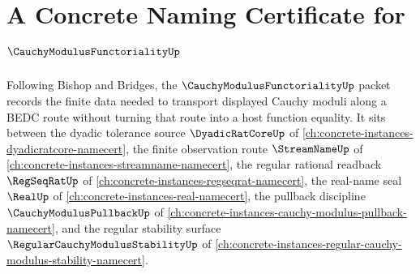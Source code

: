 \chapter{A Concrete Naming Certificate for $\CauchyModulusFunctorialityUp$}
\label{ch:concrete-instances-cauchy-modulus-functoriality-namecert}

Following Bishop and Bridges, the $\CauchyModulusFunctorialityUp$ packet records the finite data needed to transport displayed Cauchy moduli along a BEDC route without turning that route into a host function equality. It sits between the dyadic tolerance source $\DyadicRatCoreUp$ of \autoref{ch:concrete-instances-dyadicratcore-namecert}, the finite observation route $\StreamNameUp$ of \autoref{ch:concrete-instances-streamname-namecert}, the regular rational readback $\RegSeqRatUp$ of \autoref{ch:concrete-instances-regseqrat-namecert}, the real-name seal $\RealUp$ of \autoref{ch:concrete-instances-real-namecert}, the pullback discipline $\CauchyModulusPullbackUp$ of \autoref{ch:concrete-instances-cauchy-modulus-pullback-namecert}, and the regular stability surface $\RegularCauchyModulusStabilityUp$ of \autoref{ch:concrete-instances-regular-cauchy-modulus-stability-namecert}.

